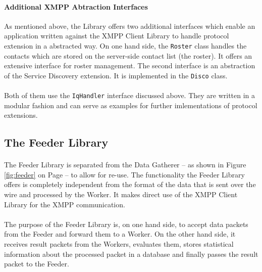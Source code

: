 \paragraph{Additional XMPP Abtraction Interfaces}
As mentioned above, the Library offers two additional interfaces which enable an application written against the XMPP Client Library to handle protocol extension in a abstracted way. On one hand side, the \texttt{Roster} class handles the contacts which are stored on the server-side contact list (the roster). It offers an extensive interface for roster management. The second interface is an abstraction of the Service Discovery extension. It is implemented in the \texttt{Disco} class.

\paragraph{}
Both of them use the \texttt{IqHandler} interface discussed above. They are written in a modular fashion and can serve as examples for further imlementations of protocol extensions.

\subsection{The Feeder Library}
\label{sec:feederlib}
\paragraph{}
The Feeder Library is separated from the Data Gatherer -- as shown in Figure \ref{fig:feeder} on Page \pageref{fig:feeder} -- to allow for re-use. The functionality the Feeder Library offers is completely independent from the format of the data that is sent over the wire and processed by the Worker. It makes direct use of the XMPP Client Library for the XMPP communication.

\paragraph{}
The purpose of the Feeder Library is, on one hand side, to accept data packets from the Feeder and forward them to a Worker. On the other hand side, it receives result packets from the Workers, evaluates them, stores statistical information about the processed packet in a database and finally passes the result packet to the Feeder.

